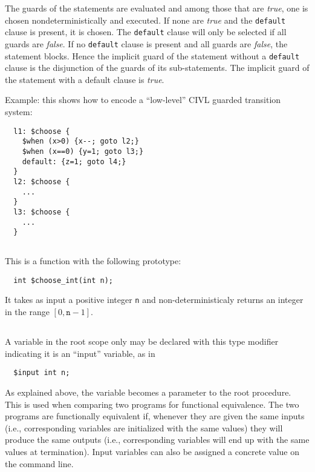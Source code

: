 \documentclass[11pt, oneside, letterpaper]{book}
\begin{document}
The guards of the statements are evaluated and among those that are
\emph{true}, one is chosen nondeterministically and executed.  If none
are \emph{true} and the \texttt{default} clause is present, it is
chosen.  The \texttt{default} clause will only be selected if all
guards are \emph{false}.  If no \texttt{default} clause is present and
all guards are \emph{false}, the statement blocks.  Hence the implicit
guard of the \cchoose{} statement without a \texttt{default} clause is
the disjunction of the guards of its sub-statements.  The implicit
guard of the \cchoose{} statement with a default clause is
\emph{true}.

Example: this shows how to encode a ``low-level'' CIVL guarded
transition system:

\begin{verbatim}
  l1: $choose {
    $when (x>0) {x--; goto l2;}
    $when (x==0) {y=1; goto l3;}
    default: {z=1; goto l4;}
  }
  l2: $choose {
    ...
  }
  l3: $choose {
    ...
  }
\end{verbatim}

\subsection{\cchooseint} This is a function with the following prototype:
\begin{verbatim}
  int $choose_int(int n);
\end{verbatim}
It takes as input a positive integer \texttt{n} and non-deterministicaly returns 
an integer in the range $[0,\texttt{n}-1]$.  

\subsection{\cinput} A variable in the root scope only may be declared
with this type modifier indicating it is an ``input'' variable, as in
\begin{verbatim}
  $input int n;
\end{verbatim}
As explained above, the variable becomes a parameter to the root
procedure.  This is used when comparing two programs for functional
equivalence.  The two programs are functionally equivalent if,
whenever they are given the same inputs (i.e., corresponding \cinput{}
variables are initialized with the same values) they will produce the
same outputs (i.e., corresponding \coutput{} variables will end up
with the same values at termination).  Input variables can also be
assigned a concrete value on the command line.
\end{document}

